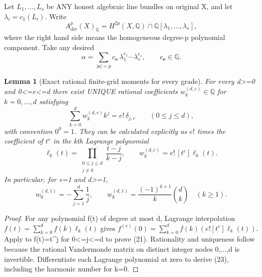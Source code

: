 \documentclass[11pt]{article}
\newtheorem{lemma}[theorem]{Lemma}
\begin{document}
Let $L_1,\dots,L_s$ be ANY honest
algebraic line bundles on original X,
and let $\lambda_i=c_1(L_i)$.
Write
\[
 A_{\mathrm{div}}^p(X)_\mathbb Q
 =H^{2p}(X,\mathbb Q)\cap
    \mathbb Q[\lambda_1,\dots,\lambda_s],
\]
where the right hand side means the
homogeneous degree-p polynomial component.
Take any desired
\[
 \alpha=\sum_{|\mathbf e|=p}
   c_{\mathbf e}\,
   \lambda_1^{e_1}\cdots\lambda_s^{e_s},
 \qquad c_{\mathbf e}\in\mathbb Q.
 \tag{20}
\]

\begin{lemma}[Exact rational finite-grid moments for every grade]
For every d>=0 and 0<=e<=d
there exist UNIQUE rational coefficients
$w^{(d,e)}_k\in\mathbb Q$
for $k=0,\dots,d$ satisfying
\[
 \boxed{
 \sum_{k=0}^d w^{(d,e)}_k k^j
       =e!\,\delta_{j,e}
 \qquad(0\le j\le d),
 }                                                       \tag{21}
\]
with convention $0^0=1$.
They can be calculated explicitly
as $e!$ times the coefficient
of $t^e$ in the kth
Lagrange polynomial
\[
 \ell_k(t)=\prod_{\substack{0\le j\le d\\j\ne k}}
             \frac{t-j}{k-j},
 \qquad
 w^{(d,e)}_k=e!\,[t^e]\ell_k(t).
 \tag{22}
\]
In particular, for e=1 and d>=1,
\[
 \boxed{
 w_0^{(d,1)}=-\sum_{j=1}^d\frac1j,\qquad
 w_k^{(d,1)}
    =\frac{(-1)^{k+1}}{k}\binom dk\quad(k\ge1).
 }                                                       \tag{23}
\]
\end{lemma}
\begin{proof}
For any polynomial f(t) of degree
at most d, Lagrange interpolation
$f(t)=\sum_{k=0}^d f(k)\ell_k(t)$
gives
$f^{(e)}(0)=\sum_{k=0}^d f(k)
(e![t^e]\ell_k(t))$.
Apply to f(t)=t^j for 0<=j<=d
to prove (21). Rationality and
uniqueness follow because the
rational Vandermonde matrix
on distinct integer nodes
0,...,d is invertible.
Differentiate each Lagrange
polynomial at zero to derive
(23), including the harmonic
number for k=0.
\end{proof}
\end{document}
